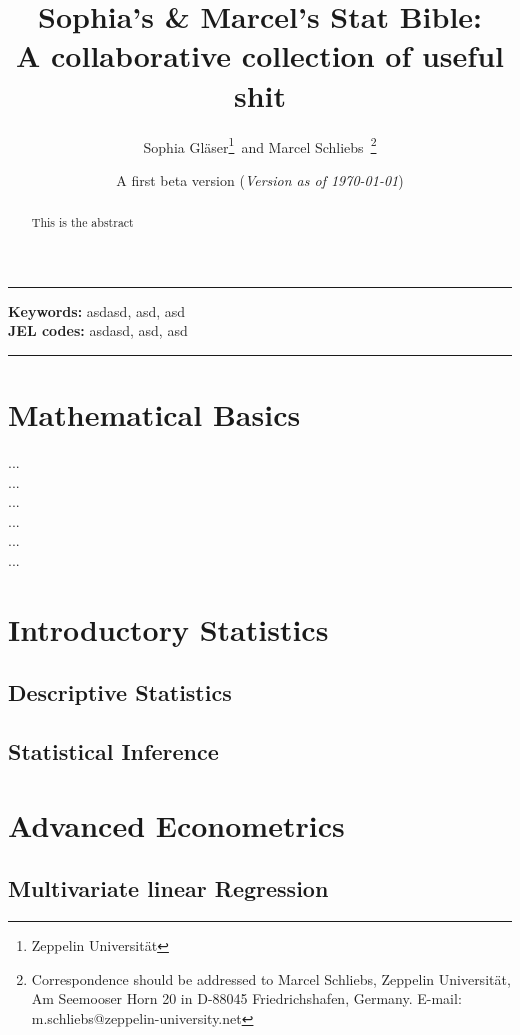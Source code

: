 \documentclass[14pt, a4paper]{article}
\title{Sophia's \& Marcel's Stat Bible:\\ A collaborative collection of useful shit}
\author{Sophia Gläser\thanks{Zeppelin Universität}\ and 
Marcel Schliebs\footnotemark[2]\
 \thanks{Correspondence should be addressed to Marcel Schliebs, Zeppelin Universität, Am Seemooser Horn 20 in D-88045 Friedrichshafen, Germany. E-mail: m.schliebs@zeppelin-university.net}}
\date{A first beta version (\textit{Version as of \today})}
\begin{document}
\maketitle

\rule{\linewidth}{0.4pt}
\begin{abstract}
This is the abstract
\end{abstract}
\textbf{Keywords:} asdasd, asd, asd\\
\medskip
\textbf{JEL codes:} asdasd, asd, asd\\
\rule{\linewidth}{0.4pt}


\maketitle

\tableofcontents
\newpage


\section{Mathematical Basics}

...\\
...\\
...\\
...\\
...\\
...\\

\section{Introductory Statistics}

\subsection{Descriptive Statistics}

\subsection{Statistical Inference}

\section{Advanced Econometrics}

\subsection{Multivariate linear Regression}
\end{document}
